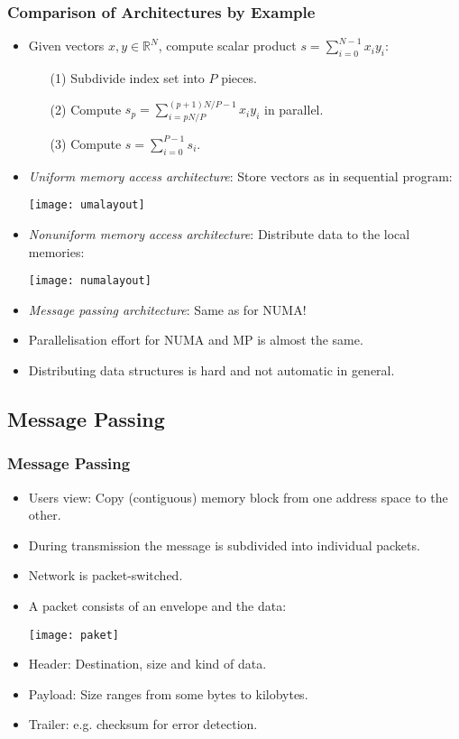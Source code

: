\begin{frame}
\frametitle{Comparison of Architectures by Example}
\begin{itemize}
\item Given vectors $x,y\in\mathbb{R}^N$, compute scalar product $s =
  \sum_{i=0}^{N-1} x_i y_i$:
\begin{itemize}
\item[(1)] Subdivide index set into $P$ pieces.
\item[(2)] Compute $s_p=\sum_{i=pN/P}^{(p+1)N/P-1} x_i y_i$ in
  parallel.
\item[(3)] Compute $s = \sum_{i=0}^{P-1} s_i$.
\end{itemize}
\item \textit{Uniform memory access architecture}: Store vectors as in
  sequential program:
\begin{center}
  \texttt{[image: umalayout]}
\end{center}
\item \textit{Nonuniform memory access architecture}: Distribute
  data to the local memories:
\begin{center}
  \texttt{[image: numalayout]}
\end{center}
\item \textit{Message passing architecture}: Same as for NUMA!
\item Parallelisation effort for NUMA and MP is almost the same.
\item Distributing data structures is hard and not automatic in
  general.
\end{itemize}
\end{frame}


\subsection{Message Passing}
\begin{frame}
\frametitle<presentation>{Message Passing}

\begin{itemize}
\item Users view: Copy (contiguous) memory block from one address space to the
  other.
\item During transmission the message is subdivided into individual packets.
\item Network is packet-switched.
\item A packet consists of an envelope and
  the data:
\begin{center}
  \texttt{[image: paket]}
\end{center}
\item Header: Destination, size and kind of data.
\item Payload: Size ranges from some bytes to kilobytes.
\item Trailer: e.g. checksum for error detection.
\end{itemize}
\end{frame}


